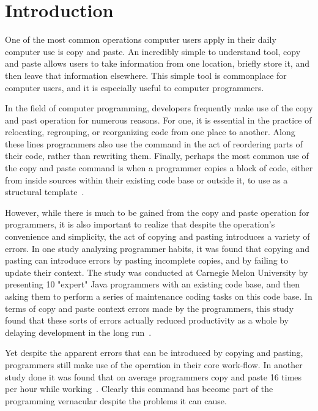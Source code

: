 \documentclass{acm_proc_article-sp}
\begin{document}

\section{Introduction}\label{sec:intro}

One of the most common operations computer users apply in their daily computer use is copy and paste. An incredibly simple to understand tool, copy and paste allows users to take information from one location, briefly store it, and then leave that information elsewhere. This simple tool is commonplace for computer users, and it is especially useful to computer programmers.

In the field of computer programming, developers frequently make use of the copy and past operation for numerous reasons. For one, it is essential in the practice of relocating, regrouping, or reorganizing code from one place to another. Along these lines programmers also use the command in the act of reordering parts of their code, rather than rewriting them. Finally, perhaps the most common use of the copy and paste command is when a programmer copies a block of code, either from inside sources within their existing code base or outside it, to use as a structural template~\cite{ooplCP}.

However, while there is much to be gained from the copy and paste operation for programmers, it is also important to realize that despite the operation's convenience and simplicity, the act of copying and pasting introduces a variety of errors. In one study analyzing programmer habits, it was found that copying and pasting can introduce errors by pasting incomplete copies, and by failing to update their context. The study was conducted at Carnegie Melon University by presenting 10 "expert" Java programmers with an existing code base, and then asking them to perform a series of maintenance coding tasks on this code base. In terms of copy and paste context errors made by the programmers, this study found that these sorts of errors actually reduced productivity as a whole by delaying development in the long run~\cite{maintenenceStudy}.

Yet despite the apparent errors that can be introduced by copying and pasting, programmers still make use of the operation in their core work-flow. In another study done it was found that on average programmers copy and paste 16 times per hour while working~\cite{ooplCP}. Clearly this command has become part of the programming vernacular despite the problems it can cause.
\end{document}
